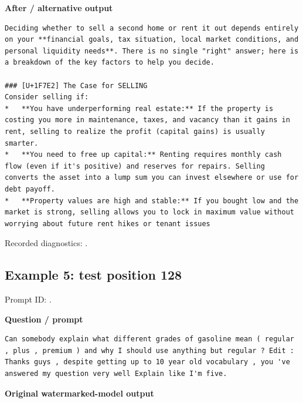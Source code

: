 \textbf{After / alternative output}

\begin{Verbatim}
Deciding whether to sell a second home or rent it out depends entirely on your **financial goals, tax situation, local market conditions, and personal liquidity needs**. There is no single "right" answer; here is a breakdown of the key factors to help you decide.

### [U+1F7E2] The Case for SELLING
Consider selling if:
*   **You have underperforming real estate:** If the property is costing you more in maintenance, taxes, and vacancy than it gains in rent, selling to realize the profit (capital gains) is usually smarter.
*   **You need to free up capital:** Renting requires monthly cash flow (even if it's positive) and reserves for repairs. Selling converts the asset into a lump sum you can invest elsewhere or use for debt payoff.
*   **Property values are high and stable:** If you bought low and the market is strong, selling allows you to lock in maximum value without worrying about future rent hikes or tenant issues
\end{Verbatim}

Recorded diagnostics:
\texttt{}.

\subsection{Example 5: test position
128}\label{record-docs-watermarking-qualitative-text-textseal2-direct-topk-md-example-5-test-position-128}

Prompt ID:
\texttt{}.

\textbf{Question / prompt}

\begin{Verbatim}
Can somebody explain what different grades of gasoline mean ( regular , plus , premium ) and why I should use anything but regular ? Edit : Thanks guys , despite getting up to 10 year old vocabulary , you 've answered my question very well Explain like I'm five.
\end{Verbatim}

\textbf{Original watermarked-model output}

